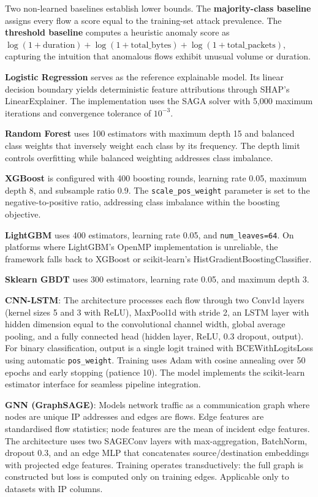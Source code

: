 \documentclass[12pt,a4paper]{report}
\begin{document}
Two non-learned baselines establish lower bounds. The \textbf{majority-class baseline} assigns every flow a score equal to the training-set attack prevalence. The \textbf{threshold baseline} computes a heuristic anomaly score as $\log(1 + \text{duration}) + \log(1 + \text{total\_bytes}) + \log(1 + \text{total\_packets})$, capturing the intuition that anomalous flows exhibit unusual volume or duration.

\textbf{Logistic Regression} serves as the reference explainable model. Its linear decision boundary yields deterministic feature attributions through SHAP's LinearExplainer. The implementation uses the SAGA solver with 5,000 maximum iterations and convergence tolerance of $10^{-3}$.

\textbf{Random Forest} uses 100 estimators with maximum depth 15 and balanced class weights that inversely weight each class by its frequency. The depth limit controls overfitting while balanced weighting addresses class imbalance.

\textbf{XGBoost} is configured with 400 boosting rounds, learning rate 0.05, maximum depth 8, and subsample ratio 0.9. The \texttt{scale\_pos\_weight} parameter is set to the negative-to-positive ratio, addressing class imbalance within the boosting objective.

\textbf{LightGBM} uses 400 estimators, learning rate 0.05, and \texttt{num\_leaves=64}. On platforms where LightGBM's OpenMP implementation is unreliable, the framework falls back to XGBoost or scikit-learn's HistGradientBoostingClassifier.

\textbf{Sklearn GBDT} uses 300 estimators, learning rate 0.05, and maximum depth 3.

\textbf{CNN-LSTM}: The architecture processes each flow through two Conv1d layers (kernel sizes 5 and 3 with ReLU), MaxPool1d with stride 2, an LSTM layer with hidden dimension equal to the convolutional channel width, global average pooling, and a fully connected head (hidden layer, ReLU, 0.3 dropout, output). For binary classification, output is a single logit trained with BCEWithLogitsLoss using automatic \texttt{pos\_weight}. Training uses Adam with cosine annealing over 50 epochs and early stopping (patience 10). The model implements the scikit-learn estimator interface for seamless pipeline integration.

\textbf{GNN (GraphSAGE)}: Models network traffic as a communication graph where nodes are unique IP addresses and edges are flows. Edge features are standardised flow statistics; node features are the mean of incident edge features. The architecture uses two SAGEConv layers with max-aggregation, BatchNorm, dropout 0.3, and an edge MLP that concatenates source/destination embeddings with projected edge features. Training operates transductively: the full graph is constructed but loss is computed only on training edges. Applicable only to datasets with IP columns.
\end{document}
